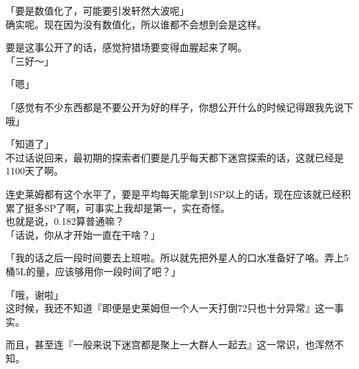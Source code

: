 「要是数值化了，可能要引发轩然大波呢」\\

确实呢。现在因为没有数值化，所以谁都不会想到会是这样。

要是这事公开了的话，感觉狩猎场要变得血腥起来了啊。\\

「三好～」

「嗯」

「感觉有不少东西都是不要公开为好的样子，你想公开什么的时候记得跟我先说下哦」

「知道了」\\

不过话说回来，最初期的探索者们要是几乎每天都下迷宫探索的话，这就已经是1100天了啊。

连史莱姆都有这个水平了，要是平均每天能拿到1SP以上的话，现在应该就已经积累了挺多SP了啊，可事实上我却是第一，实在奇怪。\\

也就是说，0.182算普通嘛？\\

「话说，你从才开始一直在干啥？」

「我的话之后一段时间要去上班啦。所以就先把外星人的口水准备好了咯。弄上5桶5L的量，应该够用你一段时间了吧？」

「哦，谢啦」\\

这时候，我还不知道『即便是史莱姆但一个人一天打倒72只也十分异常』这一事实。

而且，甚至连『一般来说下迷宫都是聚上一大群人一起去』这一常识，也浑然不知。\\
